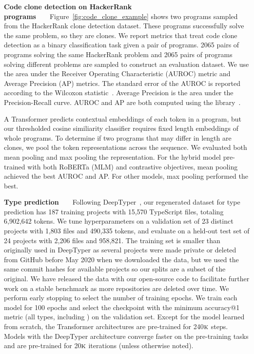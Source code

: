 \documentclass[11pt]{article}
\newcommand{\thou}[0]{$\textsc{k}$}
\begin{document}
\textbf{Code clone detection on HackerRank programs}~~~~Figure~\ref{fig:code_clone_example} shows two programs sampled from the HackerRank clone detection dataset. These programs successfully solve the same problem, so they are clones. We report metrics that treat code clone detection as a binary classification task given a pair of programs. 2065 pairs of programs solving the same HackerRank problem and 2065 pairs of programs solving different problems are sampled to construct an evaluation dataset. We use the area under the Receiver Operating Characteristic (AUROC) metric and Average Precision (AP) metrics. The standard error of the AUROC is reported according to the Wilcoxon statistic~\cite{10.5555/1089508.1089530}. Average Precision is the area under the Precision-Recall curve. AUROC and AP are both computed using the  library~\cite{scikit-learn}.

A Transformer predicts contextual embeddings of each token in a program, but our thresholded cosine similiarity classifier requires fixed length embeddings of whole programs. To determine if two programs that may differ in length are clones, we pool the token representations across the sequence. We evaluated both mean pooling and max pooling the representation. For the hybrid model pre-trained with both RoBERTa (MLM) and contrastive objectives, mean pooling achieved the best AUROC and AP. For other models, max pooling performed the best.

\textbf{Type prediction}~~~~Following DeepTyper~\citep{hellendoorn2018deep}, our regenerated dataset for type prediction has
187 training projects with 15,570 TypeScript files, totaling 6,902,642 tokens. We tune hyperparameters on a validation set of 23 distinct projects with 1,803 files and 490,335 tokens, and evaluate on a held-out test set of 24 projects with 2,206 files and 958,821. The training set is smaller than originally used in DeepTyper as several projects were made private or deleted from GitHub before May 2020 when we downloaded the data, but we used the same commit hashes for available projects so our splits are a subset of the original. We have released the data with our open-source code to facilitate further work on a stable benchmark as more repositories are deleted over time. We perform early stopping to select the number of training epochs. We train each model for 100 epochs and select the checkpoint with the minimum accuracy@1 metric (all types, including ) on the validation set. Except for the model learned from scratch, the Transformer architectures are pre-trained for 240\thou{} steps. Models with the DeepTyper architecture converge faster on the pre-training tasks and are pre-trained for 20\thou{} iterations (unless otherwise noted).
\end{document}
